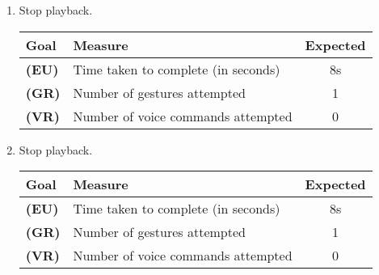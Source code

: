 \documentclass[12pt,letterpaper]{article}
\begin{document}
\begin{enumerate}
\item Stop playback.
\begin{center}\begin{tabular}{l|l|c}
\textbf{Goal} & \textbf{Measure} & \textbf{Expected} \\
\hline
\textbf{(EU)} & Time taken to complete (in seconds) & 8s \\
\hline
\textbf{(GR)} & Number of gestures attempted & 1 \\
\hline
\textbf{(VR)} & Number of voice commands attempted & 0 \\
\hline
\end{tabular}\end{center}


\item Stop playback.
\begin{center}\begin{tabular}{l|l|c}
\textbf{Goal} & \textbf{Measure} & \textbf{Expected} \\
\hline
\textbf{(EU)} & Time taken to complete (in seconds) & 8s \\
\hline
\textbf{(GR)} & Number of gestures attempted & 1 \\
\hline
\textbf{(VR)} & Number of voice commands attempted & 0 \\
\hline
\end{tabular}\end{center}

\end{enumerate}
\end{document}
